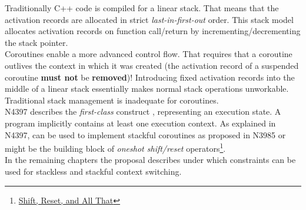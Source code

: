 Traditionally C++ code is compiled for a linear stack. That means that the
activation records are allocated in strict \emph{last-in-first-out} order. This
stack model allocates activation records on function call/return by
incrementing/decrementing the stack pointer.\\
Coroutines enable a more advanced control flow. That requires that a coroutine
outlives the context in which it was created (the activation record of a
suspended coroutine {\bfseries must not} be {\bfseries removed})!
Introducing fixed activation records into the middle of a linear stack
essentially makes normal stack operations unworkable.\\
Traditional stack management is inadequate for coroutines.\\
\newline
N4397\cite{N4397} describes the \emph{first-class} construct \ectx, representing
an execution state. A program implicitly contains at least one execution context. As
explained in N4397, \ectx can be used to implement stackful coroutines as
proposed in N3985\cite{N3985} or might be the building block of \emph{oneshot
shift/reset}
operators\footnote{\href{https://www.gnu.org/software/guile/manual/html_node/Shift-and-Reset.html}
{Shift, Reset, and All That}}.\\
In the remaining chapters the proposal describes under which constraints \ectx
can be used for stackless and stackful context switching.
